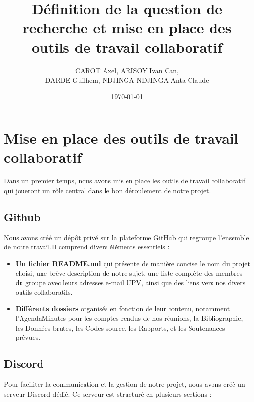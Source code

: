\documentclass{article}
\title{Définition de la question de recherche et mise en place des outils de travail collaboratif}
\author{CAROT Axel, ARISOY Ivan Can, \\ DARDE Guilhem, NDJINGA NDJINGA Anta Claude}
\date{\today}
\begin{document}
\maketitle

\section{Mise en place des outils de travail collaboratif}

Dans un premier temps, nous avons mis en place les outils de travail collaboratif qui joueront un rôle central dans le bon déroulement de notre projet.

\subsection{Github}
Nous avons créé un dépôt privé sur la plateforme GitHub qui regroupe l'ensemble de notre travail.Il comprend divers éléments essentiels :
\begin{itemize}
    \item \textbf{Un fichier README.md} qui présente de manière concise le nom du projet choisi, une brève description de notre sujet, une liste complète des membres du groupe avec leurs adresses e-mail UPV, ainsi que des liens vers nos divers outils collaboratifs.
    \item \textbf{Différents dossiers} organisés en fonction de leur contenu, notamment l'AgendaMinutes pour les comptes rendus de nos réunions, la Bibliographie, les Données brutes, les Codes source, les Rapports, et les Soutenances prévues.
\end{itemize}

\subsection{Discord}
Pour faciliter la communication et la gestion de notre projet, nous avons créé un serveur Discord dédié. Ce serveur est structuré en plusieurs sections :
\vspace{0.2cm}
\end{document}

